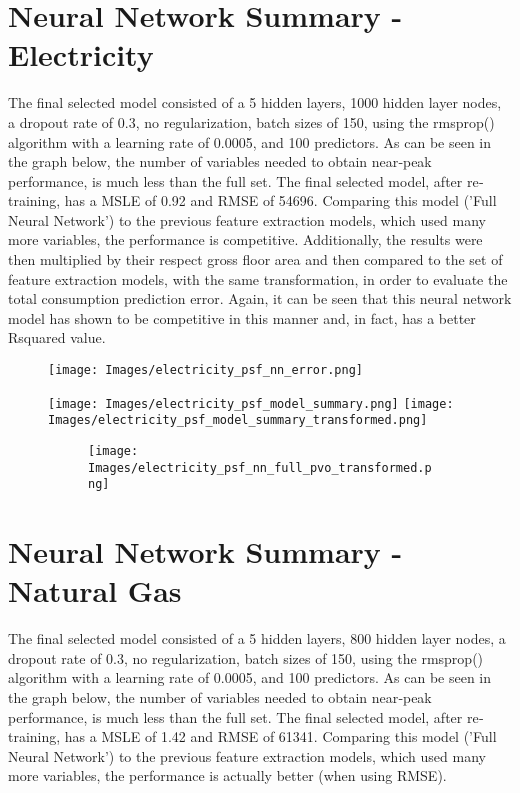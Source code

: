 \documentclass[12pt,letterpaper]{article}
\begin{document}
\section*{Neural Network Summary - Electricity}
The final selected model consisted of a 5 hidden layers, 1000 hidden layer nodes, a dropout rate of 0.3, no regularization, batch sizes of 150, using the rmsprop() algorithm with a learning rate of 0.0005, and 100 predictors. As can be seen in the graph below, the number of variables needed to obtain near‐peak performance, is much less than the full set.   The final selected
model, after re‐training, has a MSLE of 0.92 and RMSE of 54696. Comparing this model (’Full Neural Network’) to the previous feature extraction models, which used many more variables, the performance is competitive. Additionally, the results were then multiplied by their respect gross floor area and then compared to the set of feature extraction models, with the same transformation, in order to evaluate the total consumption prediction error. Again, it can be seen that this neural network model has shown to be competitive in this manner and, in fact,
has a better Rsquared value.

\begin{figure}[h]
\centering
\texttt{[image: Images/electricity\_psf\_nn\_error.png]}
\end{figure}

\begin{figure}[h]
\centering
\texttt{[image: Images/electricity\_psf\_model\_summary.png]}
\texttt{[image: Images/electricity\_psf\_model\_summary\_transformed.png]}
\end{figure}

\begin{figure}
\begin{subfigure}{1\textwidth}
\centering
\texttt{[image: Images/electricity\_psf\_nn\_full\_pvo\_transformed.png]}
\end{subfigure}
\end{figure}
\FloatBarrier

\section*{Neural Network Summary - Natural Gas}
The final selected model consisted of a 5 hidden layers, 800 hidden layer nodes, a dropout rate of 0.3, no regularization, batch sizes of 150, using the rmsprop() algorithm with a learning rate of 0.0005, and 100 predictors. As can be seen in the graph below, the number of variables needed to obtain near‐peak performance, is much less than the full set.   The final selected model, after re‐training, has a MSLE of 1.42 and RMSE of 61341. Comparing this model (’Full Neural Network’) to the previous feature extraction models, which used many more variables, the performance is actually better (when using RMSE).
\end{document}
